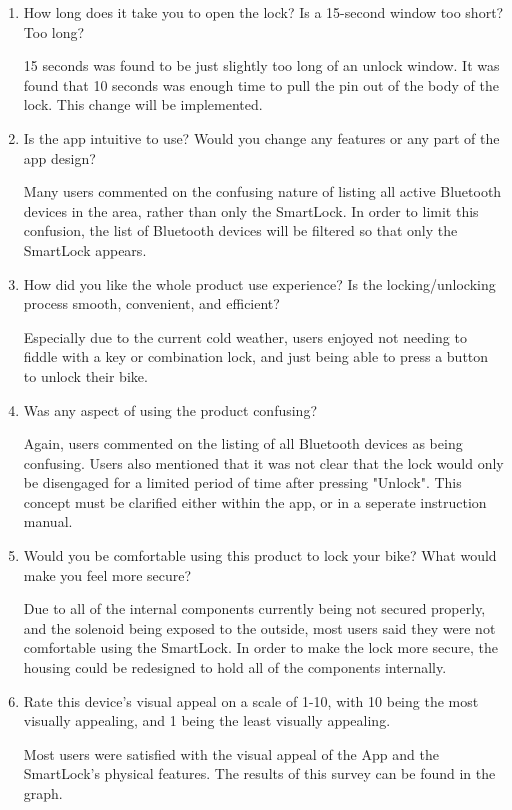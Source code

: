 \documentclass[12pt, titlepage]{article}
\begin{document}
\begin{enumerate}
    \item How long does it take you to open the lock? Is a 15-second window too short? Too long?

    15 seconds was found to be just slightly too long of an unlock window. It was found that 10 seconds was enough time to pull the pin out of the body of the lock. This change will be implemented. 
    
    \item Is the app intuitive to use? Would you change any features or any part of the app design?

    Many users commented on the confusing nature of listing all active Bluetooth devices in the area, rather than only the SmartLock. In order to limit this confusion, the list of Bluetooth devices will be filtered so that only the SmartLock appears.
    
    \item How did you like the whole product use experience? Is the locking/unlocking process smooth, convenient, and efficient?

    Especially due to the current cold weather, users enjoyed not needing to fiddle with a key or combination lock, and just being able to press a button to unlock their bike. 
    
    \item Was any aspect of using the product confusing?

    Again, users commented on the listing of all Bluetooth devices as being confusing. Users also mentioned that it was not clear that the lock would only be disengaged for a limited period of time after pressing "Unlock". This concept must be clarified either within the app, or in a seperate instruction manual.
    
    \item Would you be comfortable using this product to lock your bike? What would make you feel more secure?

    Due to all of the internal components currently being not secured properly, and the solenoid being exposed to the outside, most users said they were not comfortable using the SmartLock. In order to make the lock more secure, the housing could be redesigned to hold all of the components internally. 
    
    \item Rate this device's visual appeal on a scale of 1-10, with 10 being the most visually appealing, and 1 being the least visually appealing.
    
    Most users were satisfied with the visual appeal of the App and the SmartLock's physical features. The results of this survey can be found in the  graph.
    
\end{enumerate}
\end{document}
